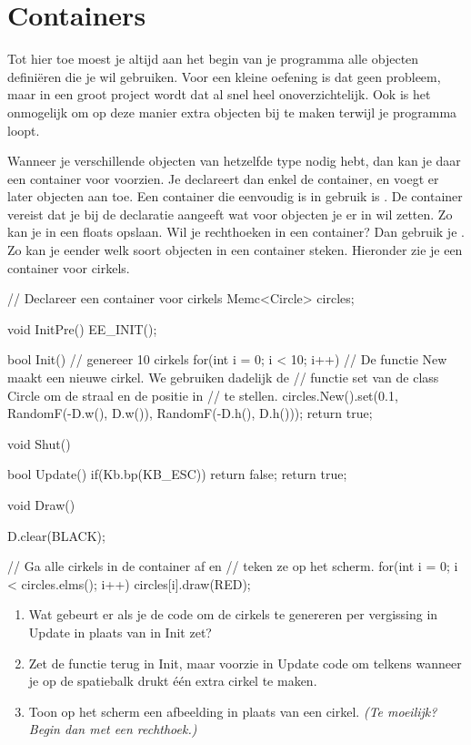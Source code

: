 \chapter{Containers}

Tot hier toe moest je altijd aan het begin van je programma alle objecten defini\"eren die je wil gebruiken. Voor een kleine oefening is dat geen probleem, maar in een groot project wordt dat al snel heel onoverzichtelijk. Ook is het onmogelijk om op deze manier extra objecten bij te maken terwijl je programma loopt.

Wanneer je verschillende objecten van hetzelfde type nodig hebt, dan kan je daar een container voor voorzien. Je declareert dan enkel de container, en voegt er later objecten aan toe. Een container die eenvoudig is in gebruik is . De container vereist dat je bij de declaratie aangeeft wat voor objecten je er in wil zetten. Zo kan je in een  floats opslaan. Wil je rechthoeken in een container? Dan gebruik je . Zo kan je eender welk soort objecten in een container steken. Hieronder zie je een container voor cirkels.

\begin{code}
// Declareer een container voor cirkels
Memc<Circle> circles;

void InitPre()
{
   EE_INIT();
}

bool Init()
{
  // genereer 10 cirkels  
	for(int i = 0; i < 10; i++)
   {
			// De functie New maakt een nieuwe cirkel. We gebruiken dadelijk de
			// functie set van de class Circle om de straal en de positie in 
			// te stellen.
      circles.New().set(0.1, RandomF(-D.w(), D.w()), RandomF(-D.h(), D.h()));
   }
   return true;
}

void Shut() {}

bool Update()
{
   if(Kb.bp(KB_ESC)) return false;  
   return true;
}

void Draw()
{
   D.clear(BLACK);
   
	 // Ga alle cirkels in de container af en 
	 // teken ze op het scherm.
   for(int i = 0; i < circles.elms(); i++)
   {
      circles[i].draw(RED);
   }
}
\end{code}

\begin{exercise}
\begin{enumerate}
\item Wat gebeurt er als je de code om de cirkels te genereren per vergissing in Update in plaats van in Init zet?
\item Zet de functie terug in Init, maar voorzie in Update code om telkens wanneer je op de spatiebalk drukt \'e\'en extra cirkel te maken.
\item Toon op het scherm een afbeelding in plaats van een cirkel. \textsl{(Te moeilijk? Begin dan met een rechthoek.)}
\end{enumerate}
\end{exercise}

